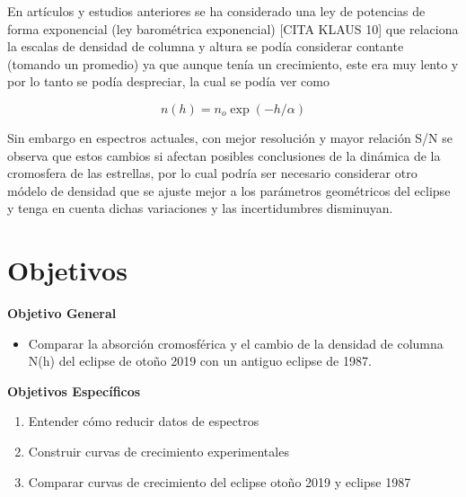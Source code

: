 \documentclass[11pt]{article}
\begin{document}
En artículos y estudios anteriores se ha considerado una ley de potencias de forma exponencial (ley barométrica exponencial) [CITA KLAUS 10] que relaciona la escalas de densidad de columna y  altura se podía considerar contante (tomando un promedio) ya que aunque tenía un crecimiento, este era muy lento y por lo tanto se podía despreciar, la cual se podía ver como

\begin{equation}
    n(h) = n_o \exp{(-h/\alpha)}
\end{equation}{}
\vspace{2mm}

Sin embargo en espectros actuales, con mejor resolución y mayor relación S/N se observa que estos cambios si afectan posibles conclusiones de la dinámica de la cromosfera de las estrellas, por lo cual podría ser necesario considerar otro módelo de densidad que se ajuste mejor a los parámetros geométricos del eclipse y tenga en cuenta dichas variaciones y las incertidumbres disminuyan.
\section{Objetivos}

\textbf{Objetivo General}

\begin{itemize}
\item Comparar la absorción cromosférica y el cambio de la densidad de columna N(h) del eclipse de otoño 2019 con un antiguo eclipse de 1987.
\end{itemize}
\textbf{Objetivos Espec\'ificos}
\begin{enumerate}
    \item Entender cómo reducir datos de espectros

    \item Construir curvas de crecimiento experimentales

    \item Comparar curvas de crecimiento del eclipse otoño 2019 y eclipse 1987
\end{enumerate}


\newpage

\end{document}

